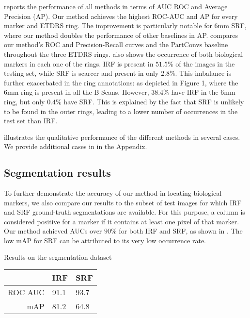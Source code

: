 reports the performance of all methods in terms of AUC ROC and Average Precision (AP). Our method achieves the highest ROC-AUC and AP for every marker and ETDRS ring. The improvement is particularly notable for 6mm SRF, where our method doubles the performance of other baselines in AP.  compares our method's ROC and Precision-Recall curves and the PartConvs baseline throughout the three ETDRS rings.  also shows the occurrence of both biological markers in each one of the rings. IRF is present in $51.5\%$ of the images in the testing set, while SRF is scarcer and present in only $2.8\%$. This imbalance is further exacerbated in the ring annotations: as depicted in Figure 1, where the 6mm ring is present in all the B-Scans. However, 38.4\% have IRF in the 6mm ring, but only $0.4\%$ have SRF. This is explained by the fact that SRF is unlikely to be found in the outer rings, leading to a lower number of occurrences in the test set than IRF. 

\noindent



 illustrates the qualitative performance of the different methods in several cases. We provide additional cases in  in the Appendix.


\subsection{Segmentation results}

To further demonstrate the accuracy of our method in locating biological markers, we also compare our results to the subset of test images for which IRF and SRF ground-truth segmentations are available. For this purpose, a column is considered positive for a marker if it contains at least one pixel of that marker. Our method achieved AUCs over $90\%$ for both IRF and SRF, as shown in . The low mAP for SRF can be attributed to its very low occurrence rate.

\begin{margintable}[]\small
\caption{Results on the segmentation dataset}
\label{tab:segmentation_results}
\begin{tabular}{@{}rp{0.75cm}p{0.75cm}@{}}
\toprule
 & {IRF} & {SRF} \\ \midrule
ROC AUC & 91.1 & 93.7 \\
mAP & 81.2 & 64.8 \\ \bottomrule
\end{tabular}
\end{margintable}


